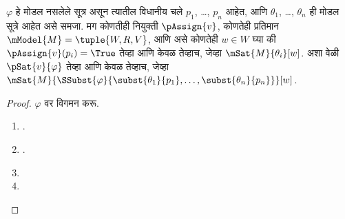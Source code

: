 \begin{lem}\label{nml:syn:tau:lem:valid-taut}
  $\varphi$ हे मोडल नसलेले सूत्र असून त्यातील
  विधानीय चले $p_1$, \dots, $p_n$ आहेत,
  आणि $\theta_1$, \dots, $\theta_n$ ही मोडल सूत्रे आहेत असे
  समजा. मग कोणतीही नियुक्ती $\pAssign{v}$, कोणतेही प्रतिमान
  $\mModel{M} = \tuple{W, R, V}$, आणि असे कोणतेही $w \in W$
  घ्या की $\pAssign{v}(p_i) = \True$ तेव्हा आणि केवळ तेव्हाच,
  जेव्हा $\mSat{M}{\theta_i}[w]$. अशा वेळी $\pSat{v}{\varphi}$
  तेव्हा आणि केवळ तेव्हाच, जेव्हा
  $\mSat{M}{\SSubst{\varphi}{\subst{\theta_1}{p_1}, \dots,
      \subst{\theta_n}{p_n}}}[w]$.
\end{lem}

\begin{proof}
  $\varphi$ वर विगमन करू.
  \begin{enumerate}
  \item {}.
  \item {}.
  \item {}
  \item {}
\end{enumerate}
\end{proof}

